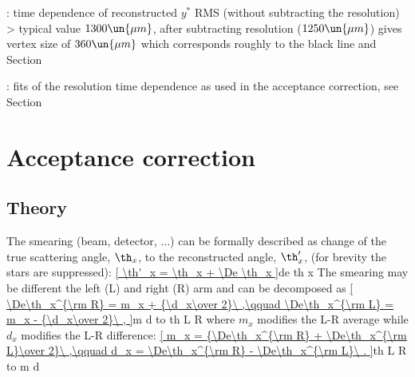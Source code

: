 \> : time dependence of reconstructed $y^*$ RMS (without subtracting the resolution)
\>> typical value $1300\un{\mu m}$, after subtracting resolution ($1250\un{\mu m}$) gives vertex size of $360\un{\mu m}$ which corresponds roughly to the black line and Section 

\> : fits of the resolution time dependence as used in the acceptance correction, see Section 



\chapter[acc-corr]{Acceptance correction}

\section{Theory}

\vskip3mm

The smearing (beam, detector, ...) can be formally described as change of the true scattering angle, $\th_x$, to the reconstructed angle, $\th'_x$, (for brevity the stars are suppressed):
\eqref{
\th'_x = \th_x + \De \th_x
}{de th x}
The smearing may be different the left (L) and right (R) arm and can be decomposed as
\eqref{
\De\th_x^{\rm R} = m_x + {\d_x\over 2}\ ,\qquad \De\th_x^{\rm L} = m_x - {\d_x\over 2}\ ,
}{m d to th L R}
where $m_x$ modifies the L-R average while $d_x$ modifies the L-R difference:
\eqref{
m_x = {\De\th_x^{\rm R} + \De\th_x^{\rm L}\over 2}\ ,\qquad d_x = \De\th_x^{\rm R} - \De\th_x^{\rm L}\ .
}{th L R to m d}

